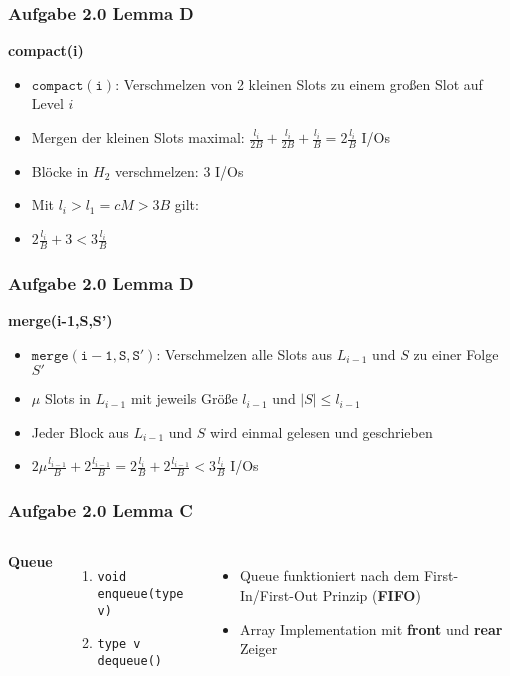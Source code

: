 \documentclass[aspectratio=169]{beamer}
\begin{document}
\begin{frame}
\frametitle{Aufgabe 2.0 Lemma D}

\textbf{compact(i)}
\begin{itemize}
	\item $\mathtt{compact(i)}$: Verschmelzen von 2 kleinen Slots zu einem großen Slot auf Level $i$
	\item Mergen der kleinen Slots maximal: $\frac{l_i}{2B} + \frac{l_i}{2B} + \frac{l_i}{B} = 2\frac{l_i}{B}$ I/Os
	\item Blöcke in $H_2$ verschmelzen: $3$ I/Os
	\item Mit $l_i > l_1 = cM > 3B$ gilt:
	\item $2\frac{l_i}{B} + 3 < 3\frac{l_i}{B}$
\end{itemize}

\end{frame}

\begin{frame}
\frametitle{Aufgabe 2.0 Lemma D}

\textbf{merge(i-1,S,S')}
\begin{itemize}
	\item $\mathtt{merge(i-1,S,S')}$: Verschmelzen alle Slots aus $L_{i-1}$ und $S$ zu einer Folge $S'$
	\item $\mu$ Slots in $L_{i-1}$ mit jeweils Größe $l_{i-1}$ und $|S| \leq  l_{i-1}$
	\item Jeder Block aus $L_{i-1}$ und $S$ wird einmal gelesen und geschrieben 
	\item $2\mu\frac{l_{i-1}}{B} + 2\frac{l_{i-1}}{B} = 2\frac{l_{i}}{B} + 2\frac{l_{i-1}}{B} < 3\frac{l_i}{B}$ I/Os
\end{itemize}

\end{frame}

\begin{frame}
\frametitle{Aufgabe 2.0 Lemma C}
\begin{columns}[c] %
	
	\textbf{Queue}
	\begin{enumerate}
		\item \texttt{void enqueue(type v)}
		\item \texttt{type v dequeue()}
	\end{enumerate}
	
	\begin{itemize}
		\item Queue funktioniert nach dem First-In/First-Out Prinzip (\textbf{FIFO})
		\item Array Implementation mit \textbf{front} und \textbf{rear} Zeiger
	\end{itemize}
	
\end{columns}
\end{frame}
\end{document}

